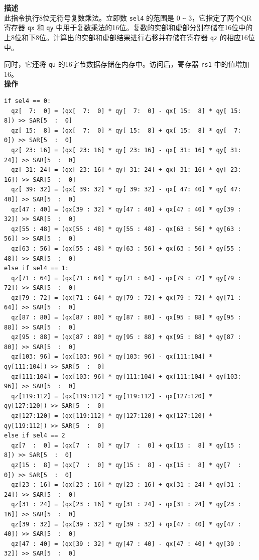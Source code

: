 \textbf{描述}\\
此指令执行8位无符号复数乘法。立即数 \lstinline{sel4} 的范围是 0 \verb+~+ 3，它指定了两个QR寄存器 \lstinline{qx} 和 \lstinline{qy} 中用于复数乘法的16位。复数的实部和虚部分别存储在16位中的上8位和下8位。计算出的实部和虚部结果进行右移并存储在寄存器 \lstinline{qz} 的相应16位中。

同时，它还将 \lstinline{qu} 的16字节数据存储在内存中。访问后，寄存器 \lstinline{rs1} 中的值增加16。\\
\textbf{操作}\\
\begin{lstlisting}
if sel4 == 0:
  qz[  7:  0] = (qx[  7:  0] * qy[  7:  0] - qx[ 15:  8] * qy[ 15:  8]) >> SAR[5  :  0]
  qz[ 15:  8] = (qx[  7:  0] * qy[ 15:  8] + qx[ 15:  8] * qy[  7:  0]) >> SAR[5  :  0]
  qz[ 23: 16] = (qx[ 23: 16] * qy[ 23: 16] - qx[ 31: 16] * qy[ 31: 24]) >> SAR[5  :  0]
  qz[ 31: 24] = (qx[ 23: 16] * qy[ 31: 24] + qx[ 31: 16] * qy[ 23: 16]) >> SAR[5  :  0]
  qz[ 39: 32] = (qx[ 39: 32] * qy[ 39: 32] - qx[ 47: 40] * qy[ 47: 40]) >> SAR[5  :  0]
  qz[47 : 40] = (qx[39 : 32] * qy[47 : 40] + qx[47 : 40] * qy[39 : 32]) >> SAR[5  :  0]
  qz[55 : 48] = (qx[55 : 48] * qy[55 : 48] - qx[63 : 56] * qy[63 : 56]) >> SAR[5  :  0]
  qz[63 : 56] = (qx[55 : 48] * qy[63 : 56] + qx[63 : 56] * qy[55 : 48]) >> SAR[5  :  0]
else if sel4 == 1:
  qz[71 : 64] = (qx[71 : 64] * qy[71 : 64] - qx[79 : 72] * qy[79 : 72]) >> SAR[5  :  0]
  qz[79 : 72] = (qx[71 : 64] * qy[79 : 72] + qx[79 : 72] * qy[71 : 64]) >> SAR[5  :  0]
  qz[87 : 80] = (qx[87 : 80] * qy[87 : 80] - qx[95 : 88] * qy[95 : 88]) >> SAR[5  :  0]
  qz[95 : 88] = (qx[87 : 80] * qy[95 : 88] + qx[95 : 88] * qy[87 : 80]) >> SAR[5  :  0]
  qz[103: 96] = (qx[103: 96] * qy[103: 96] - qx[111:104] * qy[111:104]) >> SAR[5  :  0]
  qz[111:104] = (qx[103: 96] * qy[111:104] + qx[111:104] * qy[103: 96]) >> SAR[5  :  0]
  qz[119:112] = (qx[119:112] * qy[119:112] - qx[127:120] * qy[127:120]) >> SAR[5  :  0]
  qz[127:120] = (qx[119:112] * qy[127:120] + qx[127:120] * qy[119:112]) >> SAR[5  :  0]
else if sel4 == 2
  qz[7  :  0] = (qx[7  :  0] * qy[7  :  0] + qx[15 :  8] * qy[15 :  8]) >> SAR[5  :  0]
  qz[15 :  8] = (qx[7  :  0] * qy[15 :  8] - qx[15 :  8] * qy[7  :  0]) >> SAR[5  :  0]
  qz[23 : 16] = (qx[23 : 16] * qy[23 : 16] + qx[31 : 24] * qy[31 : 24]) >> SAR[5  :  0]
  qz[31 : 24] = (qx[23 : 16] * qy[31 : 24] - qx[31 : 24] * qy[23 : 16]) >> SAR[5  :  0]
  qz[39 : 32] = (qx[39 : 32] * qy[39 : 32] + qx[47 : 40] * qy[47 : 40]) >> SAR[5  :  0]
  qz[47 : 40] = (qx[39 : 32] * qy[47 : 40] - qx[47 : 40] * qy[39 : 32]) >> SAR[5  :  0]

\end{lstlisting}
